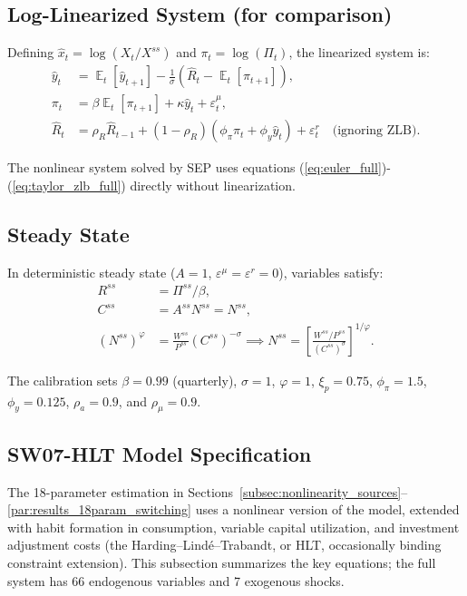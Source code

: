 \documentclass[12pt]{article}
\theoremstyle{plain}
\theoremstyle{definition}
\theoremstyle{remark}
\DeclareMathOperator{\E}{\mathbb{E}}
\newcommand{\eps}{\varepsilon}
\begin{document}
\subsection{Log-Linearized System (for comparison)}

Defining $\hat{x}_t = \log(X_t/X^{ss})$ and $\pi_t = \log(\Pi_t)$, the linearized system is:
\begin{align}
\hat{y}_t &= \E_t[\hat{y}_{t+1}] - \frac{1}{\sigma}(\hat{R}_t - \E_t[\pi_{t+1}]), \\
\pi_t &= \beta \E_t[\pi_{t+1}] + \kappa \hat{y}_t + \eps_t^\mu, \\
\hat{R}_t &= \rho_R \hat{R}_{t-1} + (1-\rho_R)(\phi_\pi \pi_t + \phi_y \hat{y}_t) + \eps_t^r \quad \text{(ignoring ZLB)}.
\end{align}

The nonlinear system solved by SEP uses equations (\ref{eq:euler_full})-(\ref{eq:taylor_zlb_full}) directly without linearization.


\subsection{Steady State}

In deterministic steady state ($A=1$, $\eps^\mu=\eps^r=0$), variables satisfy:
\begin{align}
R^{ss} &= \Pi^{ss}/\beta, \\
C^{ss} &= A^{ss} N^{ss} = N^{ss}, \\
(N^{ss})^\varphi &= \frac{W^{ss}}{P^{ss}} (C^{ss})^{-\sigma} \implies N^{ss} = \left[\frac{W^{ss}/P^{ss}}{(C^{ss})^{\sigma}}\right]^{1/\varphi}.
\end{align}

The calibration sets $\beta = 0.99$ (quarterly), $\sigma=1$, $\varphi=1$, $\xi_p=0.75$, $\phi_\pi=1.5$, $\phi_y=0.125$, $\rho_a=0.9$, and $\rho_\mu=0.9$.


\subsection{SW07-HLT Model Specification}
\label{app:sw07_model}

The 18-parameter estimation in Sections~\ref{subsec:nonlinearity_sources}--\ref{par:results_18param_switching} uses a nonlinear version of the \citet{smets2007shocks} model, extended with habit formation in consumption, variable capital utilization, and investment adjustment costs (the Harding--Lind\'e--Trabandt, or HLT, occasionally binding constraint extension). This subsection summarizes the key equations; the full system has 66 endogenous variables and 7 exogenous shocks.
\end{document}
